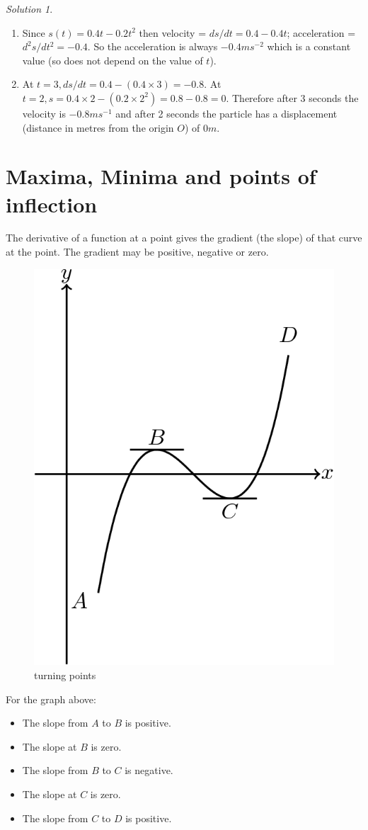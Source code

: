 \documentclass[
  11pt,
  oneside]{book}
\providecommand{\tightlist}{%
  \setlength{\itemsep}{0pt}\setlength{\parskip}{0pt}}
\newcommand{\slide}{}
\theoremstyle{definition}
\theoremstyle{definition}
\theoremstyle{definition}
\theoremstyle{definition}
\theoremstyle{remark}
\newtheorem*{solution}{Solution}
\begin{document}
\begin{solution}
\leavevmode

\begin{enumerate}
\def\labelenumi{\arabic{enumi}.}
\item
  Since \(s(t) = 0.4t-0.2t^2\) then velocity = \(ds/dt = 0.4-0.4t\); acceleration = \(d^2s/dt^2 = -0.4\).
  So the acceleration is always \(-0.4ms^{-2}\) which is a constant value (so does not depend on the value of \(t\)).
\item
  At \(t=3, ds/dt = 0.4-(0.4\times 3) = -0.8\). At \(t=2, s = 0.4\times2-(0.2\times 2^2) = 0.8-0.8 = 0\). Therefore after \(3\) seconds the velocity is \(-0.8ms^{-1}\) and after 2 seconds the particle has a displacement (distance in metres from the origin \(O\)) of \(0m\).
\end{enumerate}

\end{solution}

\slide

\section{Maxima, Minima and points of inflection}\label{lecture-eight}

The derivative of a function at a point gives the gradient (the slope) of that curve at the point. The gradient may be positive, negative or zero.

\begin{figure}

{\centering \includegraphics[width=0.3\linewidth]{tikztopng-figure6} 

}

\caption{turning points}\label{fig:unnamed-chunk-17}
\end{figure}
\slide

For the graph above:

\begin{itemize}
\tightlist
\item
  The slope from \(A\) to \(B\) is positive.
\item
  The slope at \(B\) is zero.
\item
  The slope from \(B\) to \(C\) is negative.
\item
  The slope at \(C\) is zero.
\item
  The slope from \(C\) to \(D\) is positive.
\end{itemize}
\end{document}
